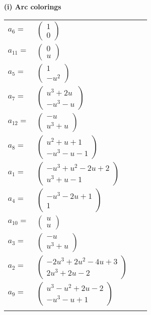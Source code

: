\documentclass[1p]{elsarticle_modified}
\theoremstyle{definition}
\begin{document}
\flushleft \textbf{(i) Arc colorings}\\
\begin{tabular}{m{7pt} m{180pt} m{7pt} m{180pt} }
\flushright $a_{6}=$&$\begin{pmatrix}1\\0\end{pmatrix}$ \\
\flushright $a_{11}=$&$\begin{pmatrix}0\\u\end{pmatrix}$ \\
\flushright $a_{5}=$&$\begin{pmatrix}1\\- u^2\end{pmatrix}$ \\
\flushright $a_{7}=$&$\begin{pmatrix}u^3+2 u\\- u^3- u\end{pmatrix}$ \\
\flushright $a_{12}=$&$\begin{pmatrix}- u\\u^3+u\end{pmatrix}$ \\
\flushright $a_{8}=$&$\begin{pmatrix}u^2+u+1\\- u^3- u-1\end{pmatrix}$ \\
\flushright $a_{1}=$&$\begin{pmatrix}- u^3+u^2-2 u+2\\u^3+u-1\end{pmatrix}$ \\
\flushright $a_{4}=$&$\begin{pmatrix}- u^3-2 u+1\\1\end{pmatrix}$ \\
\flushright $a_{10}=$&$\begin{pmatrix}u\\u\end{pmatrix}$ \\
\flushright $a_{3}=$&$\begin{pmatrix}- u\\u^3+u\end{pmatrix}$ \\
\flushright $a_{2}=$&$\begin{pmatrix}-2 u^3+2 u^2-4 u+3\\2 u^3+2 u-2\end{pmatrix}$ \\
\flushright $a_{9}=$&$\begin{pmatrix}u^3- u^2+2 u-2\\- u^3- u+1\end{pmatrix}$\\&\end{tabular}
\end{document}
